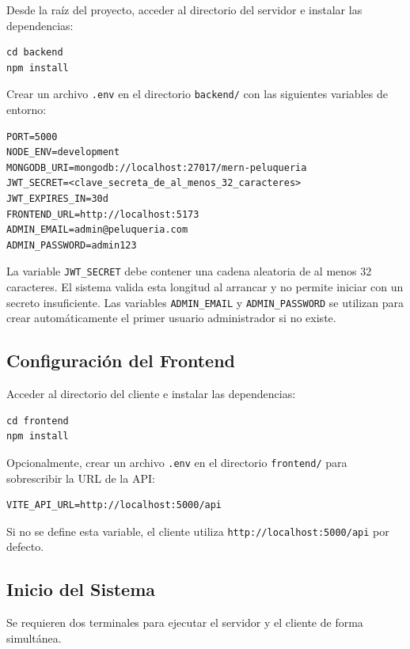 Desde la ra\'iz del proyecto, acceder al directorio del servidor e instalar las dependencias:

\begin{verbatim}
cd backend
npm install
\end{verbatim}

Crear un archivo \texttt{.env} en el directorio \texttt{backend/} con las siguientes variables de entorno:

\begin{verbatim}
PORT=5000
NODE_ENV=development
MONGODB_URI=mongodb://localhost:27017/mern-peluqueria
JWT_SECRET=<clave_secreta_de_al_menos_32_caracteres>
JWT_EXPIRES_IN=30d
FRONTEND_URL=http://localhost:5173
ADMIN_EMAIL=admin@peluqueria.com
ADMIN_PASSWORD=admin123
\end{verbatim}

La variable \texttt{JWT\_SECRET} debe contener una cadena aleatoria de al menos 32 caracteres. El sistema valida esta longitud al arrancar y no permite iniciar con un secreto insuficiente. Las variables \texttt{ADMIN\_EMAIL} y \texttt{ADMIN\_PASSWORD} se utilizan para crear autom\'aticamente el primer usuario administrador si no existe.

\subsection{Configuraci\'on del Frontend}\label{subsec:config-frontend}

Acceder al directorio del cliente e instalar las dependencias:

\begin{verbatim}
cd frontend
npm install
\end{verbatim}

Opcionalmente, crear un archivo \texttt{.env} en el directorio \texttt{frontend/} para sobrescribir la URL de la API:

\begin{verbatim}
VITE_API_URL=http://localhost:5000/api
\end{verbatim}

Si no se define esta variable, el cliente utiliza \texttt{http://localhost:5000/api} por defecto.

\subsection{Inicio del Sistema}\label{subsec:inicio}

Se requieren dos terminales para ejecutar el servidor y el cliente de forma simult\'anea.

